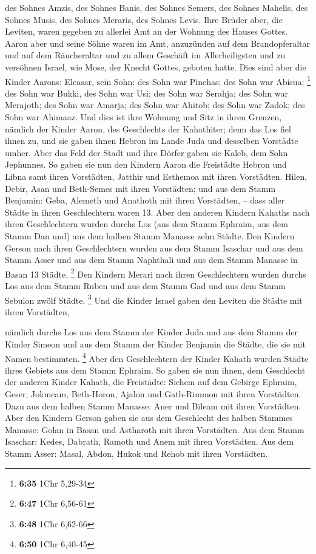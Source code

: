  des Sohnes Amzis, des Sohnes Banis, des Sohnes Semers,
 des Sohnes Mahelis, des Sohnes Musis, des Sohnes
Meraris, des Sohnes Levis.  Ihre Brüder aber, die
Leviten, waren gegeben zu allerlei Amt an der Wohnung des Hauses Gottes.
 Aaron aber und seine Söhne waren im Amt, anzuzünden auf
dem Brandopferaltar und auf dem Räucheraltar und zu allem Geschäft im
Allerheiligsten und zu versöhnen Israel, wie Mose, der Knecht Gottes,
geboten hatte.  Dies sind aber die Kinder Aarons:
Eleasar, sein Sohn: des Sohn war Pinehas; des Sohn war Abisua;
\footnote{\textbf{6:35} 1Chr 5,29-34}  des Sohn war
Bukki, des Sohn war Usi; des Sohn war Serahja;  des Sohn
war Merajoth; des Sohn war Amarja; des Sohn war Ahitob; 
des Sohn war Zadok; des Sohn war Ahimaaz.  Und dies ist
ihre Wohnung und Sitz in ihren Grenzen, nämlich der Kinder Aaron, des
Geschlechts der Kahathiter; denn das Los fiel ihnen zu, 
und sie gaben ihnen Hebron im Lande Juda und desselben Vorstädte umher.
 Aber das Feld der Stadt und ihre Dörfer gaben sie Kaleb,
dem Sohn Jephunnes.  So gaben sie nun den Kindern Aaron
die Freistädte Hebron und Libna samt ihren Vorstädten, Jatthir und
Esthemoa mit ihren Vorstädten.  Hilen, Debir,
 Asan und Beth-Semes mit ihren Vorstädten;
 und aus dem Stamm Benjamin: Geba, Alemeth und Anathoth
mit ihren Vorstädten, -- dass aller Städte in ihren Geschlechtern waren
13.  Aber den anderen Kindern Kahaths nach ihren
Geschlechtern wurden durchs Los (aus dem Stamm Ephraim, aus dem Stamm
Dan und) aus dem halben Stamm Manasse zehn Städte.  Den
Kindern Gerson nach ihren Geschlechtern wurden aus dem Stamm Isaschar
und aus dem Stamm Asser und aus dem Stamm Naphthali und aus dem Stamm
Manasse in Basan 13 Städte. \footnote{\textbf{6:47} 1Chr 6,56-61}
 Den Kindern Merari nach ihren Geschlechtern wurden
durchs Los aus dem Stamm Ruben und aus dem Stamm Gad und aus dem Stamm
Sebulon zwölf Städte. \footnote{\textbf{6:48} 1Chr 6,62-66}
 Und die Kinder Israel gaben den Leviten die Städte mit
ihren Vorstädten,

 nämlich durchs Los aus dem Stamm der Kinder Juda und aus
dem Stamm der Kinder Simeon und aus dem Stamm der Kinder Benjamin die
Städte, die sie mit Namen bestimmten. \footnote{\textbf{6:50} 1Chr
  6,40-45}  Aber den Geschlechtern der Kinder Kahath
wurden Städte ihres Gebiets aus dem Stamm Ephraim.  So
gaben sie nun ihnen, dem Geschlecht der anderen Kinder Kahath, die
Freistädte: Sichem auf dem Gebirge Ephraim, Geser, 
Jokmeam, Beth-Horon,  Ajalon und Gath-Rimmon mit ihren
Vorstädten.  Dazu aus dem halben Stamm Manasse: Aner und
Bileam mit ihren Vorstädten.  Aber den Kindern Gerson
gaben sie aus dem Geschlecht des halben Stammes Manasse: Golan in Basan
und Astharoth mit ihren Vorstädten.  Aus dem Stamm
Isaschar: Kedes, Dabrath,  Ramoth und Anem mit ihren
Vorstädten.  Aus dem Stamm Asser: Masal, Abdon,
 Hukok und Rehob mit ihren Vorstädten.

